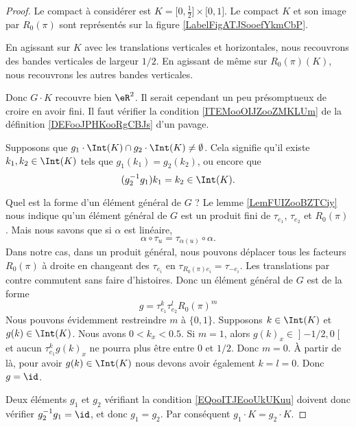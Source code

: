 \begin{proof}
    Le compact à considérer est \( K=\mathopen[ 0 , \frac{ 1 }{2} \mathclose]\times \mathopen[ 0 , 1 \mathclose]\). Le compact \( K\) et son image par \( R_0(\pi)\) sont représentés sur la figure \ref{LabelFigATJSooefYkmCbP}. %

    En agissant sur \( K\) avec les translations verticales et horizontales, nous recouvrons des bandes verticales de largeur \( 1/2\). En agissant de même sur \( R_0(\pi)(K) \), nous recouvrons les autres bandes verticales.

    Donc \( G\cdot K\) recouvre bien \( \eR^2\). Il serait cependant un peu présomptueux de croire en avoir fini. Il faut vérifier la condition \ref{ITEMooOIJZooZMKLUm} de la définition \ref{DEFooJPHKooRgCBJs} d'un pavage.

    Supposons que \( g_1\cdot\Int(K)\cap g_2\cdot \Int(K)\neq \emptyset\). Cela signifie qu'il existe \( k_1,k_2\in \Int(K)\) tels que \( g_1(k_1)=g_2(k_2)\), ou encore que
    \begin{equation}        \label{EQooITJEooUkUKuu}
        (g_2^{-1}g_1)k_1=k_2\in \Int(K).
    \end{equation}

    Quel est la forme d'un élément général de \( G\) ? Le lemme \ref{LemFUIZooBZTCiy} nous indique qu'un élément général de \( G\) est un produit fini de \( \tau_{e_1}\), \( \tau_{e_2}\) et \( R_0(\pi)\). Mais nous savons que si \( \alpha\) est linéaire,
    \begin{equation}
        \alpha\circ \tau_u=\tau_{\alpha(u)}\circ \alpha.
    \end{equation}
    Dans notre cas, dans un produit général, nous pouvons déplacer tous les facteurs \( R_0(\pi)\) à droite en changeant des \( \tau_{e_i}\) en \( \tau_{R_0(\pi)e_i}=\tau_{-e_i}\). Les translations par contre commutent sans faire d'histoires. Donc un élément général de \( G\) est de la forme
    \begin{equation}
        g=\tau_{e_1}^k\tau_{e_2}^lR_0(\pi)^m
    \end{equation}
    Nous pouvons évidemment restreindre \( m\) à \( \{ 0,1 \}\). Supposons \( k\in \Int(K)\) et \( g(k)\in \Int(K)\). Nous avons \( 0<k_x<0.5\). Si \(m=1 \), alors \( g(k)_x\in\mathopen] -1/2 , 0 \mathclose[\) et aucun \( \tau_{e_1}^kg(k)_x\) ne pourra plus être entre \( 0\) et \( 1/2\). Donc \( m=0\). À partir de là, pour avoir \( g(k)\in \Int(K)\) nous devons avoir également \( k=l=0\). Donc \( g=\id\).

    Deux éléments \( g_1\) et \( g_2\) vérifiant la condition \eqref{EQooITJEooUkUKuu} doivent donc vérifier \( g_2^{-1}g_1=\id\), et donc \( g_1=g_2\). Par conséquent \( g_1\cdot K=g_2\cdot K\).
\end{proof}

